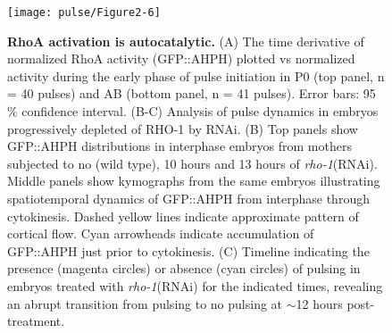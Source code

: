 \begin{figure}[!htbp]
\centering
\texttt{[image: pulse/Figure2-6]}

\caption[RhoA activation is autocatalytic.]{\label{fig:226}\textbf{RhoA activation is autocatalytic.} (A) The time derivative of normalized RhoA activity (GFP::AHPH) plotted vs normalized activity during the early phase of pulse initiation in P0 (top panel, n = 40 pulses) and AB (bottom panel, n = 41 pulses). Error bars: 95$\%$ confidence interval. (B-C) Analysis of pulse dynamics in embryos progressively depleted of RHO-1 by RNAi.  (B) Top panels show GFP::AHPH distributions in interphase embryos from mothers subjected to no (wild type), 10 hours and 13 hours of \textit{rho-1}(RNAi). Middle panels  show kymographs from the same embryos illustrating spatiotemporal dynamics of GFP::AHPH  from interphase through cytokinesis.  Dashed yellow lines indicate approximate pattern of cortical flow.  Cyan arrowheads indicate accumulation of GFP::AHPH just prior to cytokinesis.  (C) Timeline indicating the presence (magenta circles) or absence (cyan circles) of pulsing in embryos treated with \textit{rho-1}(RNAi) for the indicated times, revealing an abrupt transition from pulsing to no pulsing at $\sim$12 hours post-treatment.}
\end{figure}

